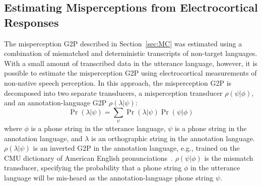 \subsection{Estimating Misperceptions from Electrocortical Responses}
\label{sec:eegchanmod}

The misperception G2P described in Section~\ref{sec:MC} was estimated
using a combination of mismatched and deterministic transcripts of
non-target languages. With a small amount
of transcribed data in the utterance language, however, it is possible
to estimate the misperception G2P using electrocortical measurements
of non-native speech perception. In this approach, the misperception G2P
is decomposed into two separate transducers,
a misperception transducer $\rho(\psi|\phi)$, and an
annotation-language G2P $\rho(\lambda|\psi)$:
\begin{equation}
  \Pr(\lambda|\psi)=\sum_{\psi}\Pr(\lambda|\psi)\Pr(\psi|\phi)
\end{equation}
where $\phi$ is a phone string in the utterance language, $\psi$ is a
phone string in the annotation language, and $\lambda$ is an
orthographic string in the annotation language.  $\rho(\lambda|\psi)$
is an inverted G2P in the annotation language, e.g., trained on the
CMU dictionary of American English pronunciations~\cite{Lenzo1995}.
$\rho(\psi|\phi)$ is the mismatch transducer, specifying the
probability that a phone string $\phi$ in the utterance language will
be mis-heard as the annotation-language phone string $\psi$. 

